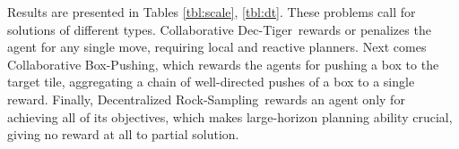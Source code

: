 \documentclass[letterpaper]{article}
\theoremstyle{definition}
\newcommand{\eliran}[1]{\textbf{[\color{red}ELIRAN:#1]}}
\newcommand{\ronen}[1]{\textbf{[\color{blue}RONEN:#1]}}
\newcommand{\cbp}[0]{Collaborative Box-Pushing}
\newcommand{\cdt}[0]{Collaborative Dec-Tiger}
\newcommand{\drs}[0]{Decentralized Rock-Sampling}
\begin{document}
\begin{table}
\centering
\scriptsize
    \caption{\label{tbl:small} FDMAP outputs a reasonable value compared to GMAA-ICE, which optimizes the small scaled problem. The last row presents results for the maximal horizon reached on DP-JESP and GMAA-ICE, and average simulations steps until reaching the goal state for FDMAP when run for unbounded number of steps. These are specified in parentheses next to the policy value.}
\end{table}

Results are presented in Tables \ref{tbl:scale}, \ref{tbl:dt}. These problems call for
solutions of different types.
\cdt\ rewards or penalizes the agent for any single move, requiring local and reactive planners.
Next comes \cbp, which rewards the agents for pushing a box to the target tile, aggregating a chain of well-directed pushes of a box to a single reward.
Finally, \drs\ rewards an agent only for achieving all of its objectives, which makes large-horizon planning ability crucial, giving no reward at all to partial solution.
\end{document}
